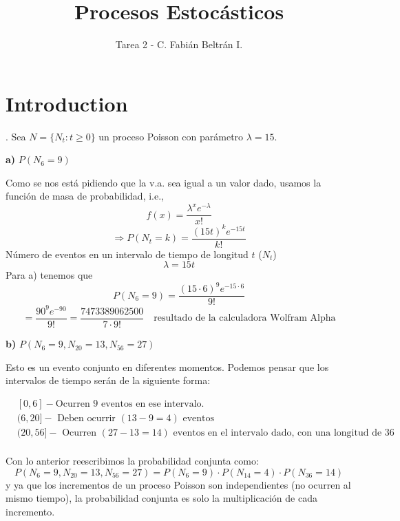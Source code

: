 \documentclass{article}
\title{Procesos Estocásticos}
\author{Tarea 2 - C. Fabián Beltrán I. }
\begin{document}
\maketitle

\section{Introduction}


. Sea \(N = \{N_t : t \ge 0\}\) un proceso Poisson con parámetro \(\lambda = 15\).

\vspace{0.3cm}

\noindent
\textbf{a) } \(P(N_6 = 9)\)

Como se nos está pidiendo que la v.a. sea igual a un valor dado, usamos la función de masa de probabilidad, i.e.,
\[
f(x) = \frac{\lambda^x e^{-\lambda}}{x!}
\]
\[
\Rightarrow P(N_t = k) = \frac{(15t)^k e^{-15t}}{k!}
\]
Número de eventos en un intervalo de tiempo de longitud \(t\) (\(N_t\))
\[
\lambda = 15t
\]
Para a) tenemos que
\[
P(N_6 = 9) = \frac{(15 \cdot 6)^9 e^{-15 \cdot 6}}{9!}
\]
\[
= \frac{90^9 e^{-90}}{9!} = \frac{7473389062500}{7 \cdot 9!} \quad \text{resultado de la calculadora Wolfram Alpha}
\]

\vspace{0.3cm}

\vspace{0.3cm}

\noindent
\textbf{b) } \(P(N_6 = 9, N_{20} = 13, N_{56} = 27)\)

\noindent
Esto es un evento conjunto en diferentes momentos. Podemos pensar que los intervalos de tiempo serán de la siguiente forma:

\begin{align*}
    &[0, 6] - \text{Ocurren 9 eventos en ese intervalo.}\\
    &(6, 20] - \text{ Deben ocurrir } (13-9=4) \text{ eventos}\\
    &(20, 56] - \text{ Ocurren } (27-13=14) \text{ eventos en el intervalo dado, con una longitud de } 36 \\
\end{align*}

\vspace{0.3cm}

Con lo anterior reescribimos la probabilidad conjunta como:
\[
P(N_6 = 9, N_{20} = 13, N_{56} = 27) = P(N_6 = 9) \cdot P(N_{14} = 4) \cdot P(N_{36} = 14)
\]
y ya que los incrementos de un proceso Poisson son independientes (no ocurren al mismo tiempo), la probabilidad conjunta es solo la multiplicación de cada incremento.
\end{document}
